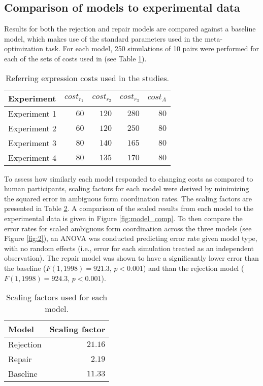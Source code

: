 \documentclass[12pt,a4paper]{article}
\begin{document}
\subsection{Comparison of models to experimental data}
\label{sec:model_comparison}
Results for both the rejection and repair models are compared against a baseline model, which makes use of the standard parameters used in the meta-optimization task. For each model, 250 simulations of 10 pairs were performed for each of the sets of costs used in \citeauthor{rohde2012} (see Table \ref{table:2}).
\begin{table}
\begin{center}
    \begin{tabular}{ l r r r r }
    Experiment & $cost_{r_1}$ & $cost_{r_2}$ & $cost_{r_3}$ & $cost_A$\\ \hline
    Experiment 1 & $60$ & $120$ & $280$ & $80$ \\ \hline
    Experiment 2 & $60$ & $120$ & $250$ & $80$ \\ \hline
    Experiment 3 & $80$ & $140$ & $165$ & $80$ \\ \hline
    Experiment 4 & $80$ & $135$ & $170$ & $80$ \\ 
    \end{tabular}
    \caption{Referring expression costs used in the \citeauthor{rohde2012} studies.}
    \label{table:2}
\end{center}
\end{table}

To assess how similarly each model responded to changing costs as compared to human participants, scaling factors for each model were derived by minimizing the squared error in ambiguous form coordination rates. The scaling factors are presented in Table \ref{table:3}. A comparison of the scaled results from each model to the experimental data is given in Figure \ref{fig:model_comp}. To then compare the error rates for scaled ambiguous form coordination across the three models (see Figure \ref{fig:2}), an ANOVA was conducted predicting error rate given model type, with no random effects (i.e., error for each simulation treated as an independent observation).  The repair model was shown to have a significantly lower error than the baseline ($F(1, 1998) = 921.3$, $p<0.001$) and than the rejection model ($F(1, 1998) = 924.3$, $p<0.001$).

\begin{table}
\begin{center}
    \begin{tabular}{ l r }
    Model & Scaling factor \\ \hline
    Rejection & $21.16$ \\ \hline
    Repair & $2.19$ \\ \hline
    Baseline & $11.33$ \\ \hline
    \end{tabular}
    \caption{Scaling factors used for each model.}
    \label{table:3}
\end{center}
\end{table}
\end{document}
